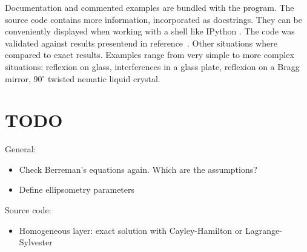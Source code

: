 Documentation and commented examples are bundled with the program.
The source code contains more information, incorporated as docstrings.
They can be conveniently displayed when working with a shell like IPython \cite{IPython}.
The code was validated against results presentend in reference~.
Other situations where compared to exact results.
Examples range from very simple to more complex situations: reflexion on glass, interferences in a glass plate, reflexion on a Bragg mirror, 90$^\circ$ twisted nematic liquid crystal.

\section{TODO}

General:
\begin{itemize}
\item Check Berreman's equations again. Which are the assumptions?
\item Define ellipsometry parameters
\end{itemize}
%
Source code:
\begin{itemize}
\item Homogeneous layer: exact solution with Cayley-Hamilton or Lagrange-Sylvester
\end{itemize}


